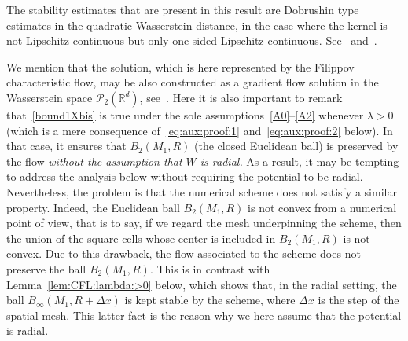 \documentclass[11pt]{article}
\theoremstyle{definition}
\numberwithin{equation}{section}
\newcommand*\RR{\mathbb{R}}
\begin{document}
The stability estimates that are present in this result are Dobrushin type estimates in the quadratic Wasserstein distance, in the case where the kernel is not Lipschitz-continuous but only one-sided Lipschitz-continuous. See~\cite{dob} and~\cite{Golse}.

We mention that the solution, which is here represented by the Filippov characteristic flow, may be also constructed as a gradient flow solution in the Wasserstein space ${\mathcal P}_{2}(\RR^d)$, see~\cite{Carrillo}. Here it is also important to remark that~\eqref{bound1Xbis} is true under the sole assumptions~\eqref{A0}--\eqref{A2} whenever $\lambda >0$ (which is a mere consequence of~\eqref{eq:aux:proof:1} and~\eqref{eq:aux:proof:2} below). In that case, it ensures that $B_2(M_1,R)$ (the closed Euclidean ball) is preserved by the flow \emph{without the assumption that $W$ is radial.} As a result, it may be tempting to address the analysis below without requiring the potential to be radial. Nevertheless, the problem is that the numerical scheme does not satisfy a similar property. Indeed, the Euclidean ball $B_2(M_1,R)$ is not convex from a numerical point of view, that is to say, if we regard the mesh underpinning the scheme, then the union of the square cells whose center is included in $B_2(M_1,R)$ is not convex. Due to this drawback, the flow associated to the scheme does not preserve the ball $B_2(M_1,R)$. This is in contrast with Lemma~\ref{lem:CFL:lambda:>0} below, which shows that, in the radial setting, the ball $B_\infty(M_1,R+\Delta x)$ is kept stable by the scheme, where $\Delta x$ is the step of the spatial mesh. This latter fact is the reason why we here assume that the potential is radial.
\end{document}
